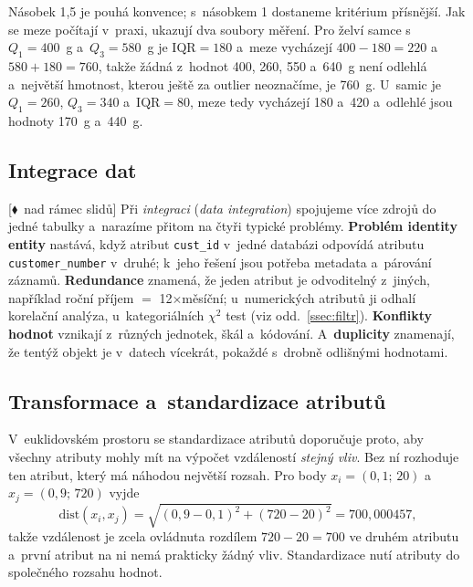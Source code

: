 \documentclass[11pt,a4paper]{article}
\theoremstyle{definition}
\newcommand{\mimo}{\textcolor{markcol}{\textsf{\footnotesize[$\blacklozenge$~nad rámec slidů]}}}
\begin{document}
Násobek 1,5 je pouhá konvence; s~násobkem 1 dostaneme kritérium přísnější. Jak se meze počítají
v~praxi, ukazují dva soubory měření. Pro želví samce s~$Q_1=400$~g a~$Q_3=580$~g je
$\mathrm{IQR}=180$ a~meze vycházejí $400-180=220$ a~$580+180=760$, takže žádná z~hodnot 400,
260, 550 a~640~g není odlehlá a~největší hmotnost, kterou ještě za outlier neoznačíme, je
760~g. U~samic je $Q_1=260$, $Q_3=340$ a~$\mathrm{IQR}=80$, meze tedy vycházejí 180 a~420
a~odlehlé jsou hodnoty 170~g a~440~g.

\subsection{Integrace dat}

\mimo{} Při \emph{integraci} (\emph{data integration}) spojujeme více zdrojů do jedné tabulky
a~narazíme přitom na čtyři typické problémy. \textbf{Problém identity entity} nastává, když
atribut \texttt{cust\_id} v~jedné databázi odpovídá atributu \texttt{customer\_number}
v~druhé; k~jeho řešení jsou potřeba metadata a~párování záznamů. \textbf{Redundance} znamená,
že jeden atribut je odvoditelný z~jiných, například roční příjem $=$ 12$\times$měsíční;
u~numerických atributů ji odhalí korelační analýza, u~kategoriálních $\chi^2$ test (viz
odd.~\ref{ssec:filtr}). \textbf{Konflikty hodnot} vznikají z~různých jednotek, škál
a~kódování. A~\textbf{duplicity} znamenají, že tentýž objekt je v~datech vícekrát, pokaždé
s~drobně odlišnými hodnotami.

\subsection{Transformace a~standardizace atributů}

V~euklidovském prostoru se standardizace atributů doporučuje proto, aby všechny atributy mohly
mít na výpočet vzdáleností \emph{stejný vliv}. Bez ní rozhoduje ten atribut, který má náhodou
největší rozsah. Pro body $x_i=(0{,}1;\,20)$ a~$x_j=(0{,}9;\,720)$ vyjde
\[ \mathrm{dist}(x_i,x_j)=\sqrt{(0{,}9-0{,}1)^2+(720-20)^2}=700{,}000457, \]
takže vzdálenost je zcela ovládnuta rozdílem $720-20=700$ ve druhém atributu a~první atribut
na ni nemá prakticky žádný vliv. Standardizace nutí atributy do společného rozsahu hodnot.
\end{document}
